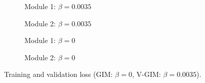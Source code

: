 \begin{figure}[h] %
	\centering
	\begin{subfigure}[b]{0.45\textwidth}
		\centering
		
		\caption{Module 1: $\beta=0.0035$}
	\end{subfigure}
	\hfill
	\begin{subfigure}[b]{0.45\textwidth}
		\centering
		
		\caption{Module 2: $\beta=0.0035$}
	\end{subfigure}		
	\hfill
	
	\begin{subfigure}[b]{0.45\textwidth}
		\centering
		
		\caption{Module 1: $\beta=0$}
	\end{subfigure}
	\hfill
	\begin{subfigure}[b]{0.45\textwidth}
		\centering
		
		\caption{Module 2: $\beta=0$}
	\end{subfigure}
	\caption{Training and validation loss (GIM: $\beta=0$, V-GIM: $\beta=0.0035$).}
	\label{fig:four_losses}
\end{figure}